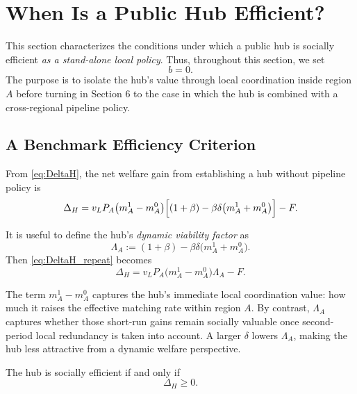 \section{When Is a Public Hub Efficient?}
\label{sec:hub_efficiency}

This section characterizes the conditions under which a public hub is socially efficient \emph{as a stand-alone local policy}. Thus, throughout this section, we set
\[
b=0.
\]
The purpose is to isolate the hub's value through local coordination inside region $A$ before turning in Section 6 to the case in which the hub is combined with a cross-regional pipeline policy.

\subsection{A Benchmark Efficiency Criterion}

From \eqref{eq:DeltaH}, the net welfare gain from establishing a hub without pipeline policy is
\begin{equation}
\Delta_H
=
v_L P_A \bigl(m_A^1-m_A^0\bigr)
\Bigl[(1+\beta)-\beta\delta\bigl(m_A^1+m_A^0\bigr)\Bigr]
-F.
\label{eq:DeltaH_repeat}
\end{equation}

It is useful to define the hub's \emph{dynamic viability factor} as
\begin{equation}
\Lambda_A
:=
(1+\beta)-\beta\delta\bigl(m_A^1+m_A^0\bigr).
\label{eq:Lambda_def}
\end{equation}
Then \eqref{eq:DeltaH_repeat} becomes
\begin{equation}
\Delta_H
=
v_L P_A \bigl(m_A^1-m_A^0\bigr)\Lambda_A - F.
\label{eq:DeltaH_Lambda}
\end{equation}

The term $m_A^1-m_A^0$ captures the hub's immediate local coordination value: how much it raises the effective matching rate within region $A$. By contrast, $\Lambda_A$ captures whether those short-run gains remain socially valuable once second-period local redundancy is taken into account. A larger $\delta$ lowers $\Lambda_A$, making the hub less attractive from a dynamic welfare perspective.

The hub is socially efficient if and only if
\[
\Delta_H \ge 0.
\]

